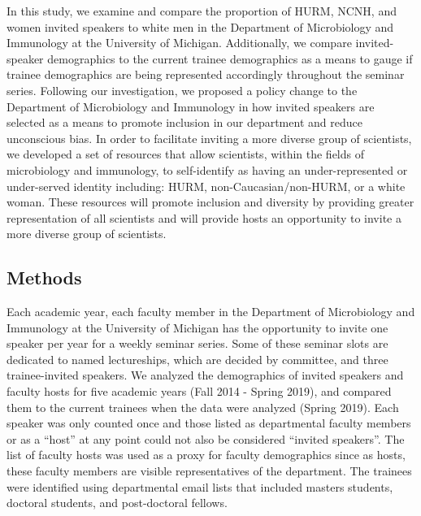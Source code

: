 \documentclass[10pt,]{article}
\begin{document}
In this study, we examine and compare the proportion of HURM, NCNH, and
women invited speakers to white men in the Department of Microbiology
and Immunology at the University of Michigan. Additionally, we compare
invited-speaker demographics to the current trainee demographics as a
means to gauge if trainee demographics are being represented accordingly
throughout the seminar series. Following our investigation, we proposed
a policy change to the Department of Microbiology and Immunology in how
invited speakers are selected as a means to promote inclusion in our
department and reduce unconscious bias. In order to facilitate inviting
a more diverse group of scientists, we developed a set of resources that
allow scientists, within the fields of microbiology and immunology, to
self-identify as having an under-represented or under-served identity
including: HURM, non-Caucasian/non-HURM, or a white woman. These
resources will promote inclusion and diversity by providing greater
representation of all scientists and will provide hosts an opportunity
to invite a more diverse group of scientists.

\subsection{Methods}\label{methods}

Each academic year, each faculty member in the Department of
Microbiology and Immunology at the University of Michigan has the
opportunity to invite one speaker per year for a weekly seminar series.
Some of these seminar slots are dedicated to named lectureships, which
are decided by committee, and three trainee-invited speakers. We
analyzed the demographics of invited speakers and faculty hosts for five
academic years (Fall 2014 - Spring 2019), and compared them to the
current trainees when the data were analyzed (Spring 2019). Each speaker
was only counted once and those listed as departmental faculty members
or as a ``host'' at any point could not also be considered ``invited
speakers''. The list of faculty hosts was used as a proxy for faculty
demographics since as hosts, these faculty members are visible
representatives of the department. The trainees were identified using
departmental email lists that included masters students, doctoral
students, and post-doctoral fellows.
\end{document}
